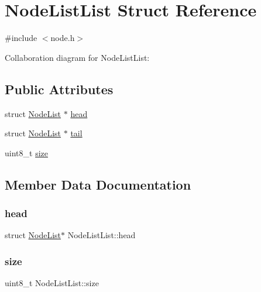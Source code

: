 \hypertarget{structNodeListList}{}\section{Node\+List\+List Struct Reference}
\label{structNodeListList}


{\ttfamily \#include $<$node.\+h$>$}



Collaboration diagram for Node\+List\+List\+:
\subsection*{Public Attributes}
\begin{DoxyCompactItemize}
\item 
struct \hyperlink{structNodeList}{Node\+List} $\ast$ \hyperlink{structNodeListList_a2f87615b8a7409d6ab7c17abfb291526}{head}
\item 
struct \hyperlink{structNodeList}{Node\+List} $\ast$ \hyperlink{structNodeListList_ae7650fb01beef0709a3156efb1d4b956}{tail}
\item 
uint8\+\_\+t \hyperlink{structNodeListList_a1ad417ae0fa143171a2c19e10a30b7d9}{size}
\end{DoxyCompactItemize}


\subsection{Member Data Documentation}
\mbox{\label{structNodeListList_a2f87615b8a7409d6ab7c17abfb291526}} 
\subsubsection{\texorpdfstring{head}{head}}
{\footnotesize\ttfamily struct \hyperlink{structNodeList}{Node\+List}$\ast$ Node\+List\+List\+::head}

\mbox{\label{structNodeListList_a1ad417ae0fa143171a2c19e10a30b7d9}} 
\subsubsection{\texorpdfstring{size}{size}}
{\footnotesize\ttfamily uint8\+\_\+t Node\+List\+List\+::size}

